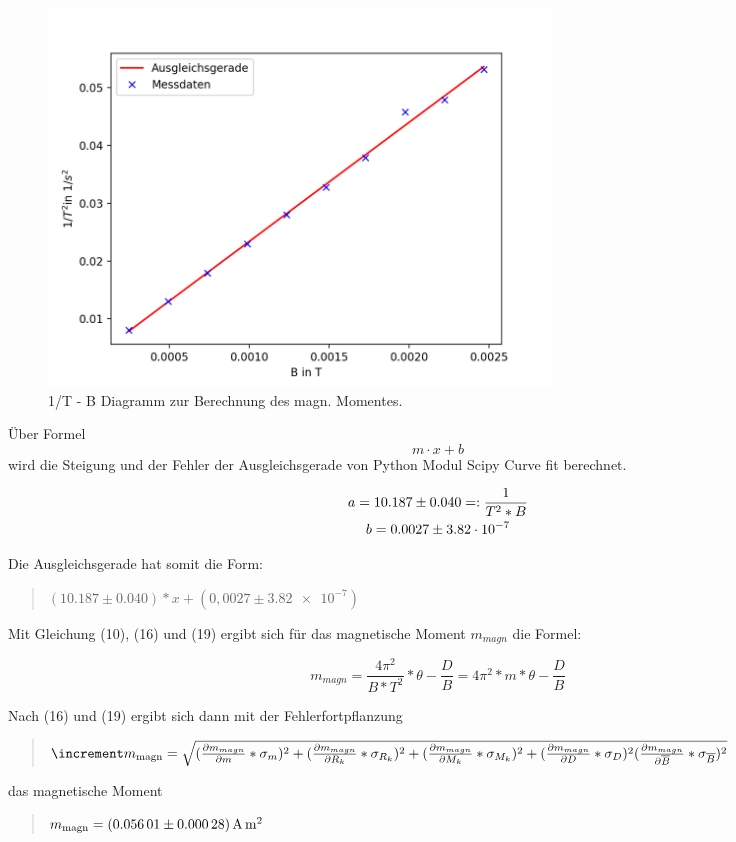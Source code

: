 \begin{figure}[h]
  \centering
  \includegraphics[height=10cm]{Auswertung/Graph.png}
  \caption{1/T - B Diagramm zur Berechnung des magn. Momentes.}
  \label{fig:Graph}
\end{figure}

Über Formel
\begin{equation}
	m\cdot x + b
\end{equation}
wird die Steigung und der Fehler der Ausgleichsgerade von Python Modul Scipy Curve fit berechnet.

\begin{gather}
	a = 10.187 \pm 0.040 =: \frac{1}{T^2*B} \notag \\
	b = 0.0027 \pm \num{3.82e-7}	\notag
\end{gather}

Die Ausgleichsgerade hat somit die Form:

\begin{quote}
	$(10.187 \pm 0.040)*x + (0,0027 \pm \num{3,82e-7})$
\end{quote}

Mit Gleichung (10), (16) und (19) ergibt sich für das magnetische Moment $m_{magn}$ die Formel:

\begin{equation}
	m_{magn} = \frac{4 \pi^2}{B*T^2}*\theta - \frac{D}{B} = 4 \pi^2*m*\theta - \frac{D}{B}
\end{equation}
\newpage

Nach (16) und (19) ergibt sich dann mit der Fehlerfortpflanzung

\begin{quote}
	$\increment m_\text{magn} = \\
	\\
	\sqrt{(\frac{\partial m_{magn}}{\partial m} * \sigma_{m})^2 + (\frac{\partial m_{magn}}{\partial R_k} * \sigma_{R_k})^2+(\frac{\partial m_{magn}}{\partial M_k} * \sigma_{M_k})^2+(\frac{\partial m_{magn}}{\partial D} * \sigma_{D})^2(\frac{\partial m_{magn}}{\partial \overline{B}} * \sigma_{\overline{B}})^2}$
\end{quote}

das magnetische Moment

\begin{quote}
	$m_\text{magn} = \SI{0.05601\pm0.00028}{\ampere\square\metre}$
\end{quote}







